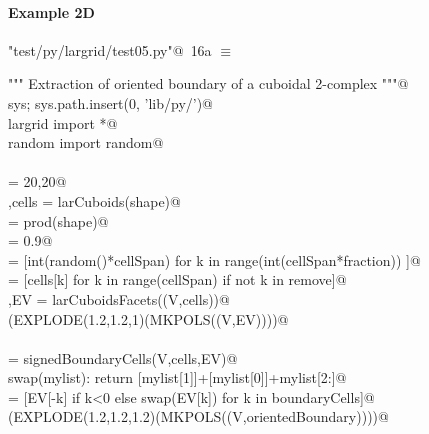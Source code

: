 \documentclass[11pt,oneside]{article}	%
\begin{document}
\paragraph{Example 2D}

\begin{flushleft} \small \label{scrap23}
\protect{}\verb@"test/py/largrid/test05.py"@\nobreak\ {\footnotesize 16a }$\equiv$
\vspace{-1ex}
\begin{list}{}{} \item
\mbox{}\verb@""" Extraction of oriented boundary of a cuboidal 2-complex """@\\
\mbox{}\verb@import sys; sys.path.insert(0, 'lib/py/')@\\
\mbox{}\verb@from largrid import *@\\
\mbox{}\verb@from random import random@\\
\mbox{}\verb@@\\
\mbox{}\verb@shape = 20,20@\\
\mbox{}\verb@V,cells = larCuboids(shape)@\\
\mbox{}\verb@cellSpan = prod(shape)@\\
\mbox{}\verb@fraction = 0.9@\\
\mbox{}\verb@remove = [int(random()*cellSpan) for k in range(int(cellSpan*fraction)) ]@\\
\mbox{}\verb@cells = [cells[k] for k in range(cellSpan) if not k in remove]@\\
\mbox{}\verb@V,EV = larCuboidsFacets((V,cells))@\\
\mbox{}\verb@VIEW(EXPLODE(1.2,1.2,1)(MKPOLS((V,EV))))@\\
\mbox{}\verb@@\\
\mbox{}\verb@boundaryCells = signedBoundaryCells(V,cells,EV)@\\
\mbox{}\verb@def swap(mylist): return [mylist[1]]+[mylist[0]]+mylist[2:]@\\
\mbox{}\verb@orientedBoundary = [EV[-k] if k<0 else swap(EV[k]) for k in boundaryCells]@\\
\mbox{}\verb@VIEW(EXPLODE(1.2,1.2,1.2)(MKPOLS((V,orientedBoundary))))@\\
\mbox{}\verb@@\\
\mbox{}\verb@@{\NWsep}
\end{list}
\vspace{-2ex}
\end{flushleft}
\end{document}
